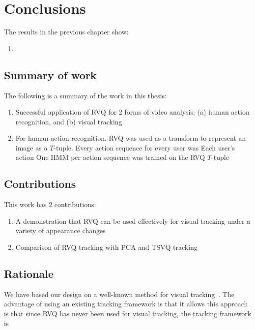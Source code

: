 \chapter{Conclusions}
\label{chap_conclusions}	
The results in the previous chapter show:

\begin{enumerate}
\item 
\end{enumerate}

\section{Summary of work}
The following is a summary of the work in this thesis:

\begin{enumerate}
\item Successful application of RVQ for 2 forms of video analysis: (a) human action recognition, and (b) visual tracking
\item For human action recognition, RVQ was used as a transform to represent an image as a $T$-tuple.  Every action sequence for every user was Each user's action One HMM per action sequence was trained on the RVQ $T$-tuple
\end{enumerate}
\section{Contributions}
This work has 2 contributions:

\begin{enumerate}
\item A demonstration that RVQ can be used effectively for visual tracking under a variety of appearance changes
\item Comparison of RVQ tracking with PCA and TSVQ tracking
\end{enumerate} 

\section{Rationale}
We have based our design on a well-known method for visual tracking~\cite{2008_JNL_subspaceTRK_Ross}.  The advantage of using an existing tracking framework is that it allows this approach is that since RVQ has never been used for visual tracking, the tracking framework is 

